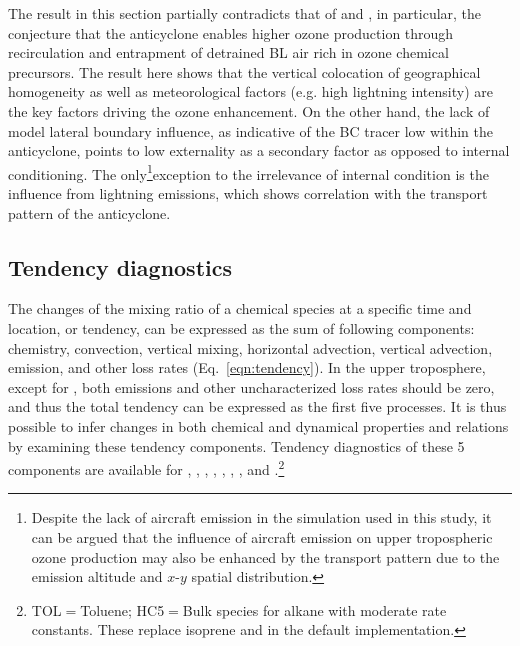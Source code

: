The result in this section partially contradicts that of \citet{Li:2005ss} and \citet{Cooper:2007cr}, in particular, the conjecture that the anticyclone
enables higher ozone production through recirculation and entrapment of detrained BL air rich in ozone chemical precursors. The result here
shows that the vertical colocation of geographical homogeneity as well as meteorological factors (e.g. high lightning intensity) are the key factors
driving the ozone enhancement. On the other hand, the lack of model lateral boundary influence, as indicative of the BC tracer low within the
anticyclone, points to low externality as a secondary factor as opposed to internal conditioning. The only\footnote{Despite the lack of aircraft
emission in the simulation used in this study, it can be argued that the influence of aircraft emission on upper tropospheric ozone production
may also be enhanced by the transport pattern due to the emission altitude and $x$-$y$ spatial distribution.}exception to the irrelevance of
internal condition is the influence from lightning emissions, which shows correlation with the transport pattern of the anticyclone.

\subsection{Tendency diagnostics}\label{ssec:2006/discuss/tendency}

The changes of the mixing ratio of a chemical species at a specific time and location, or tendency, can be expressed as
the sum of following components: chemistry, convection, vertical mixing, horizontal advection, vertical advection, emission,
and other loss rates (Eq.~\ref{eqn:tendency}). In the upper troposphere, except for , both emissions and other
uncharacterized loss rates should be zero, and thus the total tendency can be expressed as the first five processes. It is thus
possible to infer changes in both chemical and dynamical properties and relations by examining these tendency components.
Tendency diagnostics of these 5 components are available for , , , , ,
, , and .\footnote{TOL$=$Toluene; HC5$=$Bulk species for alkane with moderate 
rate constants. These replace isoprene and  in the default implementation.}


